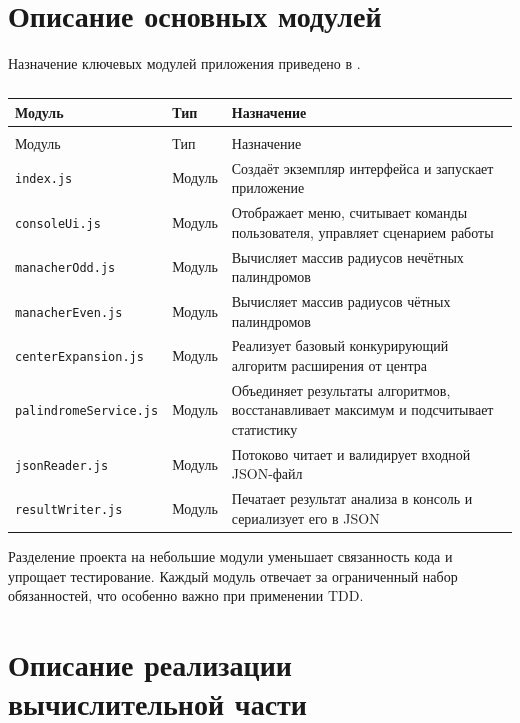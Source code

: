 \section{Описание основных модулей} \label{ch5:sec2}

Назначение ключевых модулей приложения приведено в .

\noindent
\begingroup
\centering
\small
\begin{longtable}[c]{|p{5.5cm}|p{2cm}|p{8cm}|}
    \caption{Основные модули приложения и их назначение}
    \label{tab:classes}
    \\
    \hline
    Модуль & Тип & Назначение \\ \hline
    \endfirsthead
    \captionsetup{format=tablenocaption,labelformat=continued}
    \caption[]{}\\
    \hline
    Модуль & Тип & Назначение \\ \hline
    \endhead
    \hline
    \endfoot
    \hline
    \endlastfoot
    \texttt{index.js} & Модуль & Создаёт экземпляр интерфейса и запускает приложение \\ \hline
    \texttt{consoleUi.js} & Модуль & Отображает меню, считывает команды пользователя, управляет сценарием работы \\ \hline
    \texttt{manacherOdd.js} & Модуль & Вычисляет массив радиусов нечётных палиндромов \\ \hline
    \texttt{manacherEven.js} & Модуль & Вычисляет массив радиусов чётных палиндромов \\ \hline
    \texttt{centerExpansion.js} & Модуль & Реализует базовый конкурирующий алгоритм расширения от центра \\ \hline
    \texttt{palindromeService.js} & Модуль & Объединяет результаты алгоритмов, восстанавливает максимум и подсчитывает статистику \\ \hline
    \texttt{jsonReader.js} & Модуль & Потоково читает и валидирует входной JSON-файл \\ \hline
    \texttt{resultWriter.js} & Модуль & Печатает результат анализа в консоль и сериализует его в JSON \\ \hline
\end{longtable}
\normalsize
\endgroup

Разделение проекта на небольшие модули уменьшает связанность кода и упрощает тестирование.
Каждый модуль отвечает за ограниченный набор обязанностей, что особенно важно при применении TDD.

\section{Описание реализации вычислительной части} \label{ch5:sec3}

